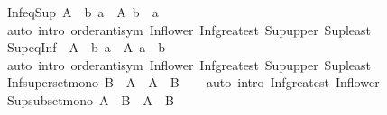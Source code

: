 \begin{isabellebody}
\isanewline
{}\isamarkupfalse%
\ Inf{\isacharunderscore}{\kern0pt}eq{\isacharunderscore}{\kern0pt}Sup{\isacharcolon}{\kern0pt}\ {\isachardoublequoteopen}{\isasymSqinter}A\ {\isacharequal}{\kern0pt}\ {\isasymSqunion}{\isacharbraceleft}{\kern0pt}b{\isachardot}{\kern0pt}\ {\isasymforall}a\ {\isasymin}\ A{\isachardot}{\kern0pt}\ b\ {\isasymle}\ a{\isacharbraceright}{\kern0pt}{\isachardoublequoteclose}\isanewline
%
\isadelimproof
\ \ %
\endisadelimproof
%
\isatagproof
{}\isamarkupfalse%
\ {\isacharparenleft}{\kern0pt}auto\ intro{\isacharcolon}{\kern0pt}\ order{\isachardot}{\kern0pt}antisym\ Inf{\isacharunderscore}{\kern0pt}lower\ Inf{\isacharunderscore}{\kern0pt}greatest\ Sup{\isacharunderscore}{\kern0pt}upper\ Sup{\isacharunderscore}{\kern0pt}least{\isacharparenright}{\kern0pt}%
\endisatagproof
{\isafoldproof}%
%
\isadelimproof
\isanewline
%
\endisadelimproof
\isanewline
{}\isamarkupfalse%
\ Sup{\isacharunderscore}{\kern0pt}eq{\isacharunderscore}{\kern0pt}Inf{\isacharcolon}{\kern0pt}\ \ {\isachardoublequoteopen}{\isasymSqunion}A\ {\isacharequal}{\kern0pt}\ {\isasymSqinter}{\isacharbraceleft}{\kern0pt}b{\isachardot}{\kern0pt}\ {\isasymforall}a\ {\isasymin}\ A{\isachardot}{\kern0pt}\ a\ {\isasymle}\ b{\isacharbraceright}{\kern0pt}{\isachardoublequoteclose}\isanewline
%
\isadelimproof
\ \ %
\endisadelimproof
%
\isatagproof
{}\isamarkupfalse%
\ {\isacharparenleft}{\kern0pt}auto\ intro{\isacharcolon}{\kern0pt}\ order{\isachardot}{\kern0pt}antisym\ Inf{\isacharunderscore}{\kern0pt}lower\ Inf{\isacharunderscore}{\kern0pt}greatest\ Sup{\isacharunderscore}{\kern0pt}upper\ Sup{\isacharunderscore}{\kern0pt}least{\isacharparenright}{\kern0pt}%
\endisatagproof
{\isafoldproof}%
%
\isadelimproof
\isanewline
%
\endisadelimproof
\isanewline
{}\isamarkupfalse%
\ Inf{\isacharunderscore}{\kern0pt}superset{\isacharunderscore}{\kern0pt}mono{\isacharcolon}{\kern0pt}\ {\isachardoublequoteopen}B\ {\isasymsubseteq}\ A\ {\isasymLongrightarrow}\ {\isasymSqinter}A\ {\isasymle}\ {\isasymSqinter}B{\isachardoublequoteclose}\isanewline
%
\isadelimproof
\ \ %
\endisadelimproof
%
\isatagproof
{}\isamarkupfalse%
\ {\isacharparenleft}{\kern0pt}auto\ intro{\isacharcolon}{\kern0pt}\ Inf{\isacharunderscore}{\kern0pt}greatest\ Inf{\isacharunderscore}{\kern0pt}lower{\isacharparenright}{\kern0pt}%
\endisatagproof
{\isafoldproof}%
%
\isadelimproof
\isanewline
%
\endisadelimproof
\isanewline
{}\isamarkupfalse%
\ Sup{\isacharunderscore}{\kern0pt}subset{\isacharunderscore}{\kern0pt}mono{\isacharcolon}{\kern0pt}\ {\isachardoublequoteopen}A\ {\isasymsubseteq}\ B\ {\isasymLongrightarrow}\ {\isasymSqunion}A\ {\isasymle}\ {\isasymSqunion}B{\isachardoublequoteclose}\isanewline

\end{isabellebody}

